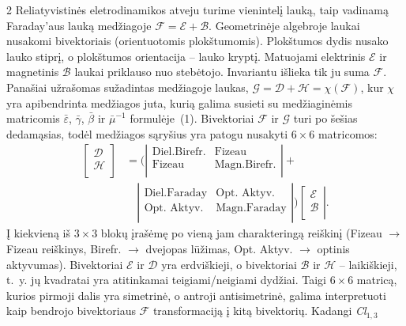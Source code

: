 \documentclass[a4paper,10pt,lithuanian]{article}
\def\cF{\mathcal{F}}
\def\cD{\mathcal{D}}
\def\cE{\mathcal{E}}
\def\cG{\mathcal{G}}
\def\cB{\mathcal{B}}
\def\cH{\mathcal{H}}
\begin{document}
\begin{multicols*}{2}
Reliatyvistinės eletrodinamikos atveju turime vienintelį lauką,
taip vadinamą Faraday'aus lauką medžiagoje $\cF=\cE+\cB$.
Geometrinėje algebroje laukai nusakomi bivektoriais (orientuotomis
plokštumomis). Plokštumos dydis nusako lauko stiprį, o plokštumos
orientacija -- lauko kryptį. Matuojami elektrinis $\cE$  ir  magnetinis $\cB$ laukai
priklauso nuo stebėtojo. Invariantu išlieka tik ju suma  $\cF$.
Panašiai užrašomas sužadintas  medžiagoje laukas,
$\cG=\cD+\cH=\chi(\cF)$, kur $\chi$ yra apibendrinta medžiagos
juta, kurią galima susieti su medžiaginėmis matricomis $\bar{\varepsilon}$, $\bar{\gamma}$, $\bar{\beta}$ ir
$\bar{\mu}^{-1}$ formulėje~(1). Bivektoriai $\cF$ ir $\cG$ turi po šešias
dedamąsias, todėl medžiagos sąryšius yra patogu nusakyti $6\times
6$ matricomos:
\begin{equation}\begin{split}\label{transform}
 \left[\begin{array}{c}
\cD\\
\cH\\
\end{array}\right]&=\Big(
\left|\begin{array}{c|c}
\text{Diel.Birefr.}&\text{Fizeau}\\
\hline
\text{Fizeau}&\text{Magn.Birefr.}\\
\end{array}\right|
+\\
&\quad\left|\begin{array}{c|c}
\text{Diel.Faraday}&\text{Opt. Aktyv.}\\
\hline
\text{Opt. Aktyv.}&\text{Magn.Faraday}\\
\end{array}\right|
\Big) \left[\begin{array}{c}
\cE\\
\cB\\
\end{array}\right|.
\end{split}\end{equation}
Į kiekvieną iš $3\times 3$ blokų įrašėmę po vieną jam charakteringą reiškinį
(Fizeau $\rightarrow$ Fizeau reiškinys, Birefr. $\rightarrow$
dvejopas lūžimas, Opt. Aktyv. $\rightarrow$ optinis aktyvumas). Bivektoriai $\cE$ ir $\cD$ yra erdviškieji, o
bivektoriai $\cB$ ir $\cH$ -- laikiškieji, t.~y. jų kvadratai yra
atitinkamai teigiami/neigiami dydžiai. Taigi $6\times 6$ matricą,
kurios pirmoji dalis yra simetrinė, o antroji antisimetrinė,
galima interpretuoti kaip bendrojo bivektoriaus $\cF$
transformaciją į kitą bivektorių. Kadangi \textit{Cl}$_{1,3}$

\end{multicols*}
\end{document}

